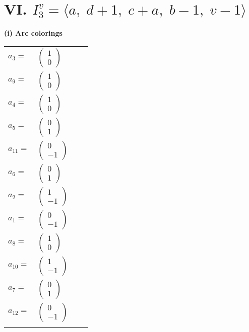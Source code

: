 \documentclass[1p]{elsarticle_modified}
\theoremstyle{definition}
\begin{document}
\centering \section*{VI. $I^v_{3}= \langle a,\;d+1,\;c+a,\;b-1,\;v-1 \rangle$}
\flushleft \textbf{(i) Arc colorings}\\
\begin{tabular}{m{7pt} m{180pt} m{7pt} m{180pt} }
\flushright $a_{3}=$&$\begin{pmatrix}1\\0\end{pmatrix}$ \\
\flushright $a_{9}=$&$\begin{pmatrix}1\\0\end{pmatrix}$ \\
\flushright $a_{4}=$&$\begin{pmatrix}1\\0\end{pmatrix}$ \\
\flushright $a_{5}=$&$\begin{pmatrix}0\\1\end{pmatrix}$ \\
\flushright $a_{11}=$&$\begin{pmatrix}0\\-1\end{pmatrix}$ \\
\flushright $a_{6}=$&$\begin{pmatrix}0\\1\end{pmatrix}$ \\
\flushright $a_{2}=$&$\begin{pmatrix}1\\-1\end{pmatrix}$ \\
\flushright $a_{1}=$&$\begin{pmatrix}0\\-1\end{pmatrix}$ \\
\flushright $a_{8}=$&$\begin{pmatrix}1\\0\end{pmatrix}$ \\
\flushright $a_{10}=$&$\begin{pmatrix}1\\-1\end{pmatrix}$ \\
\flushright $a_{7}=$&$\begin{pmatrix}0\\1\end{pmatrix}$ \\
\flushright $a_{12}=$&$\begin{pmatrix}0\\-1\end{pmatrix}$\\&\end{tabular}
\end{document}
